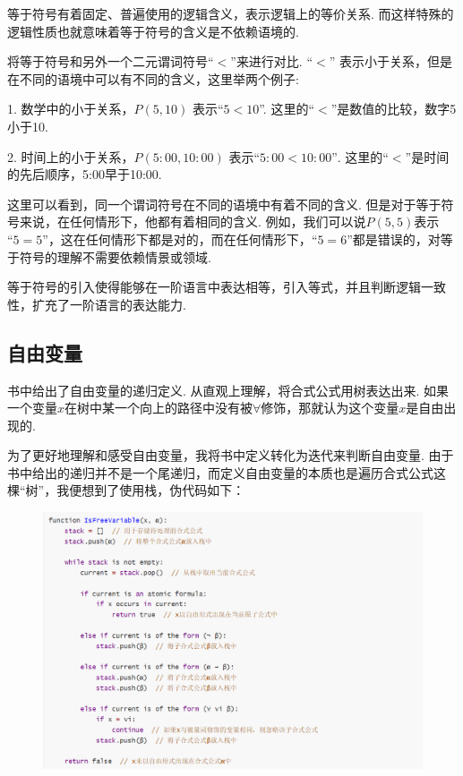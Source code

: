 等于符号有着固定、普遍使用的逻辑含义，表示逻辑上的等价关系. 而这样特殊的逻辑性质也就意味着等于符号的含义是不依赖语境的.

将等于符号和另外一个二元谓词符号$“<”$来进行对比. $“<”$ 表示小于关系，但是在不同的语境中可以有不同的含义，这里举两个例子:

1. 数学中的小于关系，$P(5, 10)$ 表示“$5 < 10$”. 这里的$“<”$是数值的比较，数字5小于10.

2. 时间上的小于关系，$P(5:00, 10:00)$ 表示$“5:00 < 10:00”$. 这里的$“<”$是时间的先后顺序，5:00早于10:00.

这里可以看到，同一个谓词符号在不同的语境中有着不同的含义. 但是对于等于符号来说，在任何情形下，他都有着相同的含义. 例如，我们可以说$P(5, 5)$表示$“5 = 5”$，这在任何情形下都是对的，而在任何情形下，$“5 = 6”$都是错误的，对等于符号的理解不需要依赖情景或领域.

等于符号的引入使得能够在一阶语言中表达相等，引入等式，并且判断逻辑一致性，扩充了一阶语言的表达能力.

\subsection{自由变量}
书中给出了自由变量的递归定义. 从直观上理解，将合式公式用树表达出来. 如果一个变量$x$在树中某一个向上的路径中没有被$\forall$修饰，那就认为这个变量$x$是自由出现的.

为了更好地理解和感受自由变量，我将书中定义转化为迭代来判断自由变量. 由于书中给出的递归并不是一个尾递归，而定义自由变量的本质也是遍历合式公式这棵“树”，我便想到了使用栈，伪代码如下：


\begin{figure}[H]
  \centering
  \includegraphics[width=\textwidth]{figure/2.png}
\end{figure}




